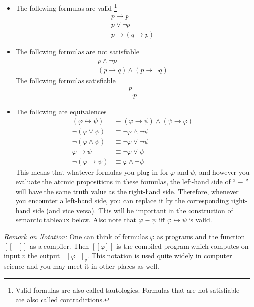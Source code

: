 \documentclass[11pt]{article}
\renewcommand{\phi}{\varphi}
\newcommand{\imp}{\ensuremath{\rightarrow}}
\newcommand{\biimp}{\ensuremath{\leftrightarrow}}
\newcommand{\et}{\ensuremath{\wedge}} %
\newcommand{\ou}{\ensuremath{\vee}} %
\newcommand{\sem}[1]{[\![#1]\!]}
\newcounter{prop}
\begin{document}
\begin{example}\label{exle:prop:valid} 
\begin{itemize}
\item The following formulas are
  valid \footnote{Valid formulas are also called tautologies. Formulas
  that are not satisfiable are also called contradictions.}
\begin{align*}
p\imp p\\
p\ou\neg p\\
p\imp(q\imp p)
\end{align*}
\item The following formulas are not satisfiable
\begin{align*}
p\et\neg p\\
(p\imp q)\et(p\imp\neg q)
\end{align*}
The following formulas satisfiable
\begin{align*}
p\\
\neg p
\end{align*}

\item The following are equivalences
\begin{align*}
(\phi\biimp\psi) & \equiv  (\phi\imp \psi)\et(\psi\imp \phi)\\
\neg(\phi\ou\psi)& \equiv \neg\phi\et\neg\psi\\
\neg(\phi\et\psi)& \equiv \neg\phi\ou\neg\psi\\
\phi\imp\psi &\equiv \neg\phi\ou\psi\\
\neg(\phi\imp\psi)&\equiv \phi\et\neg\psi
\end{align*}
This means that whatever formulas you plug in for $\phi$ and $\psi$,
and however you evaluate the atomic propositions in these formulas,
the left-hand side of ``$\equiv$'' will have the same truth value as
the right-hand side. Therefore, whenever you encounter a left-hand
side, you can replace it by the corresponding right-hand side (and
vice versa). This will be important in the construction of semantic
tableaux below. Also note that $\phi\equiv\psi$ iff 
$\phi\biimp\psi$ is valid.
\end{itemize}
\end{example}



\bigskip\noindent\emph{Remark on Notation: } One can think of formulas $\phi$
as programs and the function $\sem{-}$ as a compiler.  Then
$\sem{\phi}$ is the compiled program which computes on input $v$ the
output $\sem{\phi}_v$. This notation is used quite widely in computer
science and you may meet it in other places as well.
\end{document}
